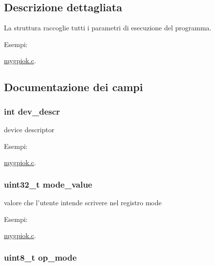 \subsection{Descrizione dettagliata}
La struttura raccoglie tutti i parametri di esecuzione del programma. \begin{Desc}
\item[Esempi\+: ]\par
\hyperlink{mygpiok_8c-example}{mygpiok.\+c}.\end{Desc}


\subsection{Documentazione dei campi}
\hypertarget{structparam__t_a52701f5f8091598d5c5ac1bb80cd2070}{
\subsubsection[{dev\+\_\+descr}]{\setlength{\rightskip}{0pt plus 5cm}int dev\+\_\+descr}}\label{structparam__t_a52701f5f8091598d5c5ac1bb80cd2070}


device descriptor 

\begin{Desc}
\item[Esempi\+: ]\par
\hyperlink{mygpiok_8c-example}{mygpiok.\+c}.\end{Desc}
\hypertarget{structparam__t_a007b34e09ccda08824bc74ab9d86c5a8}{
\subsubsection[{mode\+\_\+value}]{\setlength{\rightskip}{0pt plus 5cm}uint32\+\_\+t mode\+\_\+value}}\label{structparam__t_a007b34e09ccda08824bc74ab9d86c5a8}


valore che l'utente intende scrivere nel registro mode 

\begin{Desc}
\item[Esempi\+: ]\par
\hyperlink{mygpiok_8c-example}{mygpiok.\+c}.\end{Desc}
\hypertarget{structparam__t_aec948fb30e99b1eda7e3d9ff741d417a}{
\subsubsection[{op\+\_\+mode}]{\setlength{\rightskip}{0pt plus 5cm}uint8\+\_\+t op\+\_\+mode}}\label{structparam__t_aec948fb30e99b1eda7e3d9ff741d417a}



